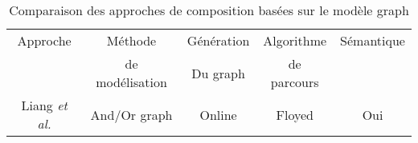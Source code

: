 \begin{table}[htb!]
  \centering
  \begin{tabular}{|c|c|c|c|c|}
    \hline
    Approche& Méthode& Génération& Algorithme & Sémantique\\
    &de modélisation & Du graph & de parcours & \\  \hline
    Liang \textit{et al.} \cite{liang2005and} & And/Or graph & Online & Floyed & Oui\\
    \hline
  \end{tabular}
  \newline
  \caption{Comparaison des approches de composition basées sur le modèle graph}
  \label{comparaison-graph-composition}
\end{table}
